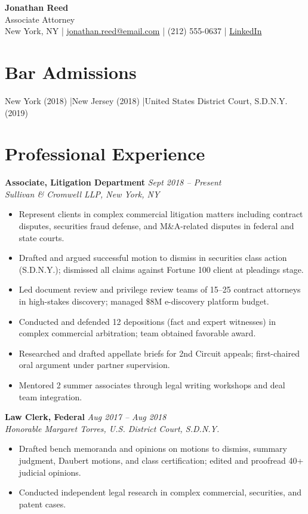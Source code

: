 \documentclass[11pt,a4paper]{article}
\begin{document}
\begin{center}
  {\LARGE \textbf{Jonathan Reed}}\\[3pt]
  Associate Attorney\\[4pt]
  New York, NY \quad|\quad
  \href{mailto:jonathan.reed@email.com}{jonathan.reed@email.com} \quad|\quad
  (212) 555-0637 \quad|\quad
  \href{https://linkedin.com/in/jonathanreed-attorney}{LinkedIn}
\end{center}

\section{Bar Admissions}
New York (2018) \quad|\quad New Jersey (2018) \quad|\quad United States District Court, S.D.N.Y. (2019)

\section{Professional Experience}

\noindent\textbf{Associate, Litigation Department} \hfill \textit{Sept 2018 -- Present}\\
\textit{Sullivan \& Cromwell LLP, New York, NY}
\begin{itemize}
  \item Represent clients in complex commercial litigation matters including contract disputes, securities fraud defense, and M\&A-related disputes in federal and state courts.
  \item Drafted and argued successful motion to dismiss in securities class action (S.D.N.Y.); dismissed all claims against Fortune 100 client at pleadings stage.
  \item Led document review and privilege review teams of 15--25 contract attorneys in high-stakes discovery; managed \$8M e-discovery platform budget.
  \item Conducted and defended 12 depositions (fact and expert witnesses) in complex commercial arbitration; team obtained favorable award.
  \item Researched and drafted appellate briefs for 2nd Circuit appeals; first-chaired oral argument under partner supervision.
  \item Mentored 2 summer associates through legal writing workshops and deal team integration.
\end{itemize}

\vspace{4pt}
\noindent\textbf{Law Clerk, Federal} \hfill \textit{Aug 2017 -- Aug 2018}\\
\textit{Honorable Margaret Torres, U.S. District Court, S.D.N.Y.}
\begin{itemize}
  \item Drafted bench memoranda and opinions on motions to dismiss, summary judgment, Daubert motions, and class certification; edited and proofread 40+ judicial opinions.
  \item Conducted independent legal research in complex commercial, securities, and patent cases.
\end{itemize}
\end{document}
